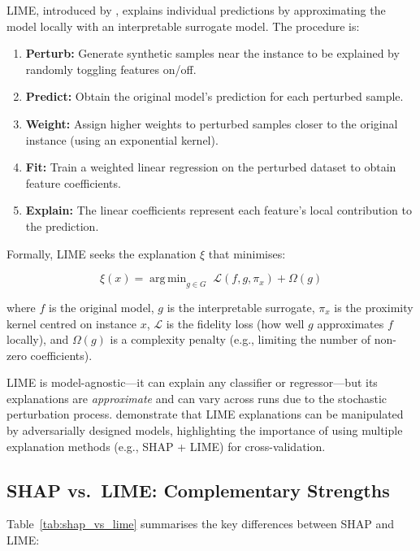 \documentclass[12pt,a4paper]{report}
\DeclareMathOperator*{\argmin}{arg\,min}
\begin{document}
LIME, introduced by \citet{ribeiro2016why}, explains individual predictions by approximating the model locally with an interpretable surrogate model. The procedure is:

\begin{enumerate}[label=\arabic*.]
  \item \textbf{Perturb:} Generate synthetic samples near the instance to be explained by randomly toggling features on/off.
  \item \textbf{Predict:} Obtain the original model's prediction for each perturbed sample.
  \item \textbf{Weight:} Assign higher weights to perturbed samples closer to the original instance (using an exponential kernel).
  \item \textbf{Fit:} Train a weighted linear regression on the perturbed dataset to obtain feature coefficients.
  \item \textbf{Explain:} The linear coefficients represent each feature's local contribution to the prediction.
\end{enumerate}

Formally, LIME seeks the explanation $\xi$ that minimises:

\begin{equation}
\xi(x) = \argmin_{g \in G} \; \mathcal{L}(f, g, \pi_x) + \Omega(g)
\label{eq:lime}
\end{equation}

\noindent where $f$ is the original model, $g$ is the interpretable surrogate, $\pi_x$ is the proximity kernel centred on instance $x$, $\mathcal{L}$ is the fidelity loss (how well $g$ approximates $f$ locally), and $\Omega(g)$ is a complexity penalty (e.g., limiting the number of non-zero coefficients).

LIME is model-agnostic---it can explain any classifier or regressor---but its explanations are \textit{approximate} and can vary across runs due to the stochastic perturbation process. \citet{slack2020fooling} demonstrate that LIME explanations can be manipulated by adversarially designed models, highlighting the importance of using multiple explanation methods (e.g., SHAP + LIME) for cross-validation.

\subsection{SHAP vs.\ LIME: Complementary Strengths}

Table~\ref{tab:shap_vs_lime} summarises the key differences between SHAP and LIME:
\end{document}
